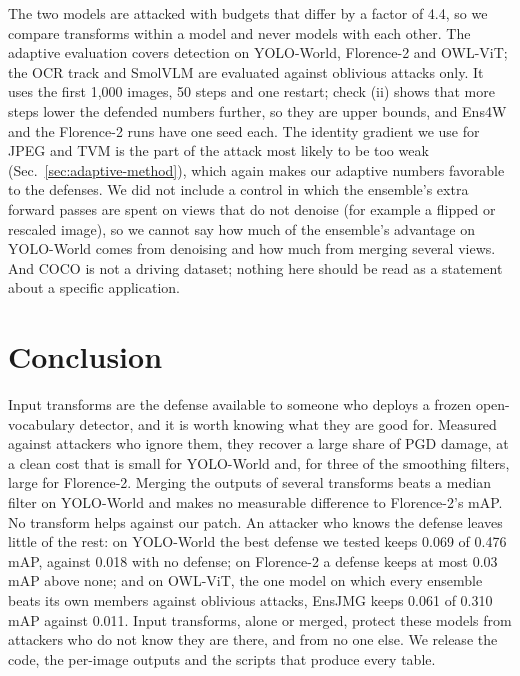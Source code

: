 \documentclass[11pt]{article}
\newcommand{\yw}{YOLO-World}
\newcommand{\fl}{Florence-2}
\begin{document}
The two models are attacked with budgets that differ by a factor of 4.4, so
we compare transforms within a model and never models with each other. The
adaptive evaluation covers detection on \yw{}, \fl{} and OWL-ViT; the OCR
track and SmolVLM are evaluated against oblivious attacks only. It uses the
first 1{,}000 images, 50 steps and one restart; check (ii) shows that more
steps lower the defended numbers further, so they are upper bounds, and
Ens4W and the \fl{} runs have one seed each. The identity gradient we use
for JPEG and TVM is the part of the attack most likely to be too weak
(Sec.~\ref{sec:adaptive-method}), which again makes our adaptive numbers
favorable to the defenses. We did not include a control in which
the ensemble's extra forward passes are spent on views that do not denoise
(for example a flipped or rescaled image), so we cannot say how much of the
ensemble's advantage on \yw{} comes from denoising and how much from merging
several views. And COCO is not a driving dataset; nothing here should be read
as a statement about a specific application.

\section{Conclusion}

Input transforms are the defense available to someone who deploys a frozen
open-vocabulary detector, and it is worth knowing what they are good for.
Measured against attackers who ignore them, they recover a large share of
PGD damage, at a clean cost that is small for \yw{} and, for three of the
smoothing filters, large for \fl{}. Merging the outputs of several transforms
beats a median filter on \yw{} and makes no measurable difference to \fl{}'s
mAP. No transform helps
against our patch. An attacker who knows the defense leaves little of the
rest: on \yw{} the best defense we tested keeps 0.069 of 0.476 mAP, against
0.018 with no defense; on \fl{} a defense keeps at most 0.03 mAP above
none; and on OWL-ViT, the one model on which every ensemble beats its own
members against oblivious attacks, EnsJMG keeps 0.061 of 0.310 mAP against
0.011. Input transforms, alone or merged, protect these models from attackers
who do not know they are there, and from no one else. We release the code,
the per-image outputs and the scripts that produce every table.



\end{document}
